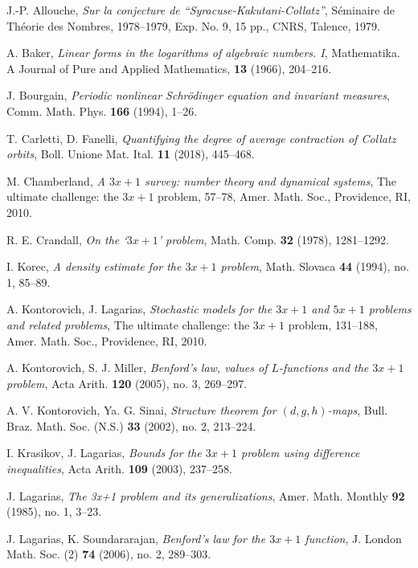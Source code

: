 \documentclass[12pt,a4paper,reqno]{amsart}
\numberwithin{equation}{section}
\theoremstyle{plain}
\theoremstyle{definition}
\begin{document}
\begin{thebibliography}{10}

J.-P. Allouche, \emph{Sur la conjecture de ``Syracuse-Kakutani-Collatz''}, S\'eminaire de Th\'eorie des Nombres, 1978--1979, Exp. No. 9, 15 pp., CNRS, Talence, 1979.

A. Baker, \emph{Linear forms in the logarithms of algebraic numbers. I}, Mathematika. A Journal of Pure and Applied Mathematics, \textbf{13} (1966), 204--216. 

J. Bourgain, \emph{Periodic nonlinear Schr\"odinger equation and invariant measures}, Comm. Math. Phys. \textbf{166}
(1994), 1--26.

T. Carletti, D. Fanelli, \emph{Quantifying the degree of average contraction of Collatz orbits}, Boll. Unione Mat. Ital. \textbf{11} (2018), 445--468.


M. Chamberland, \emph{A $3x+1$ survey: number theory and dynamical systems}, The ultimate challenge: the $3x+1$ problem, 57--78, Amer. Math. Soc., Providence, RI, 2010. 

R. E. Crandall, \emph{On the `$3x+1$' problem}, Math. Comp. \textbf{32} (1978), 1281--1292.

I. Korec, \emph{A density estimate for the $3x+1$ problem}, Math. Slovaca \textbf{44} (1994), no. 1, 85--89. 

A. Kontorovich, J. Lagarias, \emph{Stochastic models for the $3x+1$ and $5x+1$ problems and related problems}, The ultimate challenge: the $3x+1$ problem, 131--188, Amer. Math. Soc., Providence, RI, 2010.

A. Kontorovich, S. J. Miller, \emph{Benford's law, values of $L$-functions and the $3x+1$ problem}, Acta Arith. \textbf{120} (2005), no. 3, 269--297. 

A. V. Kontorovich, Ya. G. Sinai, \emph{Structure theorem for $(d,g,h)$-maps}, Bull. Braz. Math. Soc. (N.S.) \textbf{33} (2002), no. 2, 213--224.


I. Krasikov, J. Lagarias, \emph{Bounds for the $3x + 1$ problem using difference inequalities}, Acta Arith. \textbf{109} (2003), 237--258.

J. Lagarias, \emph{The 3x+1 problem and its generalizations}, Amer. Math. Monthly \textbf{92} (1985), no. 1, 3--23. 

J. Lagarias, K. Soundararajan, \emph{Benford's law for the $3x+1$ function}, J. London Math. Soc. (2) \textbf{74} (2006), no. 2, 289--303. 


\end{thebibliography}
\end{document}

